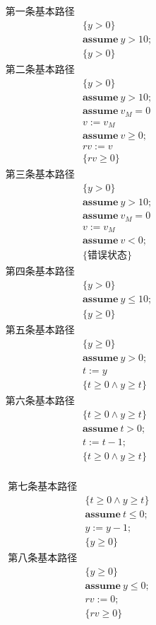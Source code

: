\documentclass[11pt,a4paper]{article}
\begin{document}
\begin{solution}
    \begin{align*}
    	\text{第一条基本路径}& \\
    	&\{y>0\} \\
    	&\textbf{assume}\ y>10; \\
    	&\{y>0\} \\
    	\text{第二条基本路径}& \\
    	&\{y>0\} \\
    	&\textbf{assume}\ y>10; \\
    	&\textbf{assume}\ v_M=0 \\
    	&v:=v_M \\
    	&\textbf{assume}\ v\geq 0; \\
    	&rv:=v \\
    	&\{rv\geq0\} \\
    	\text{第三条基本路径}& \\
    	&\{y>0\} \\
    	&\textbf{assume}\ y>10; \\
    	&\textbf{assume}\ v_M=0 \\
    	&v:=v_M \\
    	&\textbf{assume}\ v < 0; \\
    	&\{\text{错误状态}\} \\
    	\text{第四条基本路径}& \\
    	&\{y>0\} \\
    	&\textbf{assume}\ y\leq 10;\\
    	&\{y\geq 0\}\\
    	\text{第五条基本路径}& \\
    	&\{y\geq 0\} \\
    	&\textbf{assume}\ y>0; \\
    	&t:=y \\
    	&\{t \geq 0 \land y \geq t\} \\
    	\text{第六条基本路径}& \\
    	&\{t \geq 0 \land y \geq t\} \\
    	&\textbf{assume}\ t>0; \\
    	&t:=t-1; \\
    	&\{t \geq 0 \land y \geq t\} \\
    \end{align*}
    	
   	\begin{align*}
    	\text{第七条基本路径}& \\
    	&\{t \geq 0 \land y \geq t\} \\
    	&\textbf{assume}\ t\leq0; \\
    	&y:=y-1; \\
    	&\{y\geq 0\} \\
    	\text{第八条基本路径}& \\
    	&\{y\geq 0\} \\
    	&\textbf{assume}\ y\leq 0; \\
    	&rv:=0; \\
    	&\{rv\geq 0\} \\
    \end{align*}
\end{solution}
\end{document}
